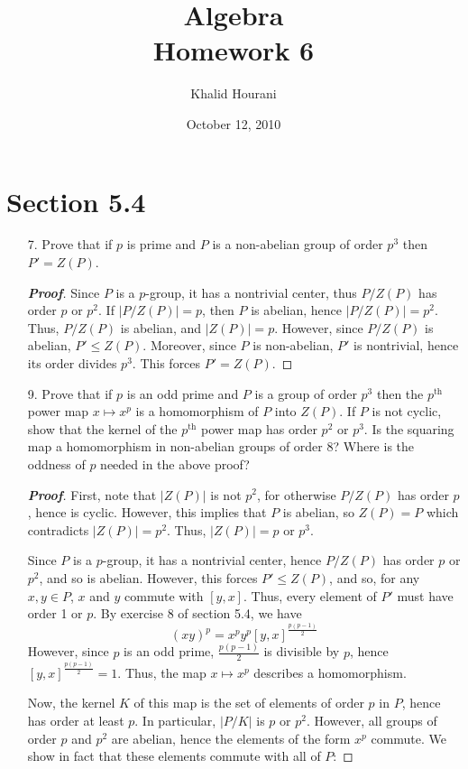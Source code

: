 \documentclass[12pt,leqno]{book}
\title{Algebra\\\large Homework 6}
\date{October 12, 2010}
\author{Khalid Hourani}
\theoremstyle{definition}
\newenvironment{Proof}{\begin{proof}[\textnormal{\textbf{Proof}}]}{\end{proof}}
\begin{document}
 \begin{titlepage}
  \maketitle
 \end{titlepage}
\section*{Section 5.4}
\begin{enumerate}
 \item [7.] Prove that if $p$ is prime and $P$ is a non-abelian group of order $p^3$ then $P'=Z(P)$. 

\begin{Proof}
 Since $P$ is a $p$-group, it has a nontrivial center, thus $P/Z(P)$ has order $p$ or $p^2$. If $|P/Z(P)|=p$, then $P$ is abelian, hence $|P/Z(P)|=p^2$. Thus, $P/Z(P)$ is abelian, and $|Z(P)|=p$. However, since $P/Z(P)$ is abelian, $P'\leq Z(P)$. Moreover, since $P$ is non-abelian, $P'$ is nontrivial, hence its order divides $p^3$. This forces $P'=Z(P)$.
\end{Proof}

 \item [9.] Prove that if $p$ is an odd prime and $P$ is a group of order $p^3$ then the $p^{\text{th}}$ power map $x\mapsto x^p$ is a homomorphism of $P$ into $Z(P)$. If $P$ is not cyclic, show that the kernel of the $p^{\text{th}}$ power map has order $p^2$ or $p^3$. Is the squaring map a homomorphism in non-abelian groups of order 8? Where is the oddness of $p$ needed in the above proof?

\begin{Proof}
First, note that $|Z(P)|$ is not $p^2$, for otherwise $P/Z(P)$ has order $p$, hence is cyclic. However, this implies that $P$ is abelian, so $Z(P)=P$ which contradicts $|Z(P)|=p^2$. Thus, $|Z(P)|=p$ or $p^3$.

Since $P$ is a $p$-group, it has a nontrivial center, hence $P/Z(P)$ has order $p$ or $p^2$, and so is abelian. However, this forces $P'\leq Z(P)$, and so, for any $x,y\in P$, $x$ and $y$ commute with $[y,x]$. Thus, every element of $P'$ must have order 1 or $p$. By exercise 8 of section 5.4, we have \[(xy)^p=x^py^p[y,x]^{\frac{p(p-1)}{2}}\] However, since $p$ is an odd prime, $\frac{p(p-1)}{2}$ is divisible by $p$, hence $[y,x]^{\frac{p(p-1)}{2}}=1$. Thus, the map $x\mapsto x^p$ describes a homomorphism.

Now, the kernel $K$ of this map is the set of elements of order $p$ in $P$, hence has order at least $p$. In particular, $|P/K|$ is $p$ or $p^2$. However, all groups of order $p$ and $p^2$ are abelian, hence the elements of the form $x^p$ commute. We show in fact that these elements commute with all of $P$:


\end{Proof}
\end{enumerate}
\end{document}
